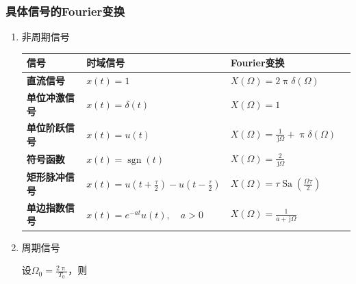 \documentclass[UTF8,fontset=fandol,zihao=5]{ctexart}
\newcommand{\jj}{\,\mathrm{j}}
\begin{document}
\subsubsection{具体信号的Fourier变换}

\begin{enumerate}


  \item 非周期信号
    \begin{center}
    \begin{tabularx}{0.98\textwidth}{>{\bfseries}p{2.3cm}X X X}
    \toprule
    信号 & 时域信号 & Fourier变换 \\
    \midrule

    直流信号
    &
    $\displaystyle
    x(t)=1
    $
    &
    $\displaystyle
    X(\varOmega)
    =
    2\uppi\delta(\varOmega)
    $
    \\

    单位冲激信号
    &
    $\displaystyle
    x(t)=\delta(t)
    $
    &
    $\displaystyle
    X(\varOmega)=1
    $
    \\

    单位阶跃信号
    &
    $\displaystyle
    x(t)=u(t)
    $
    &
    $\displaystyle
    X(\varOmega)
    =
    \frac{1}{\jj\varOmega}+\uppi\delta(\varOmega)
    $
    \\

    符号函数
    &
    $\displaystyle
    x(t)=\operatorname{sgn}(t)
    $
    &
    $\displaystyle
    X(\varOmega)
    =
    \frac{2}{\jj\varOmega}
    $
    \\

    矩形脉冲信号
    &
    $\displaystyle
    x(t)
    =
    u\left(t+\frac{\tau}{2}\right)
    -
    u\left(t-\frac{\tau}{2}\right)
    $
    &
    $\displaystyle
    X(\varOmega)
    =
    \tau
    \operatorname{Sa}
    \left(
    \frac{\varOmega\tau}{2}
    \right)
    $
    \\

    单边指数信号
    &
    $\displaystyle
    x(t)=e^{-at}u(t),
    \quad a>0
    $
    &
    $\displaystyle
    X(\varOmega)
    =
    \frac{1}{a+\jj\varOmega}
    $
    \\

    \bottomrule
    \end{tabularx}
    \end{center}
  
  \item 周期信号
  
    设$\displaystyle \varOmega_0=\frac{2\uppi}{T_0}$，则


\end{enumerate}
\end{document}
